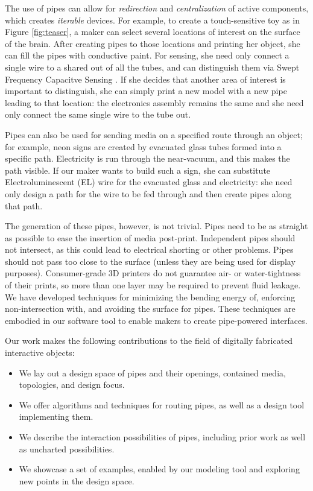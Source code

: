 The use of pipes can allow for \emph{redirection} and \emph{centralization} of active components, which creates \emph{iterable} devices.  For example, to create a touch-sensitive toy as in Figure \ref{fig:teaser}, a maker can select several locations of interest on the surface of the brain.  After creating pipes to those locations and printing her object, she can fill the pipes with conductive paint.  For sensing, she need only connect a single wire to a shared out of all the tubes, and can distinguish them via Swept Frequency Capacitve Sensing \cite{Sato-touche}.  If she decides that another area of interest is important to distinguish, she can simply print a new model with a new pipe leading to that location: the electronics assembly remains the same and she need only connect the same single wire to the tube out.  

Pipes can also be used for sending media on a specified route through an object; for example, neon signs are created by evacuated glass tubes formed into a specific path.  Electricity is run through the near-vacuum, and this makes the path visible.  If our maker wants to build such a sign, she can substitute Electroluminescent (EL) wire for the evacuated glass and electricity: she need only design a path for the wire to be fed through and then create pipes along that path.

The generation of these pipes, however, is not trivial.  Pipes need to be as straight as possible to ease the insertion of media post-print.  Independent pipes should not intersect, as this could lead to electrical shorting or other problems.  Pipes should not pass too close to the surface (unless they are being used for display purposes).  Consumer-grade 3D printers do not guarantee air- or water-tightness of their prints, so more than one layer may be required to prevent fluid leakage.  We have developed techniques for minimizing the bending energy of, enforcing non-intersection with, and avoiding the surface for pipes.  These techniques are embodied in our software tool to enable makers to create pipe-powered interfaces.

Our work makes the following contributions to the field of digitally fabricated interactive objects:

\begin{itemize}
\item We lay out a design space of pipes and their openings, contained media, topologies, and design focus.
\item We offer algorithms and techniques for routing pipes, as well as a design tool implementing them.
\item We describe the interaction possibilities of pipes, including prior work as well as uncharted possibilities.
\item We showcase a set of examples, enabled by our modeling tool and exploring new points in the design space.
\end{itemize}

